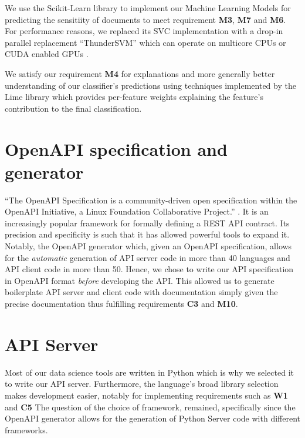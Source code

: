 \documentclass[\version]{l4proj}
\begin{document}
We use the Scikit-Learn library to implement our Machine Learning Models \autocite{pedregosaScikitlearnMachineLearning2011} for predicting the sensitiity of documents to meet requirement \textbf{M3}, \textbf{M7} and \textbf{M6}. For performance reasons, we replaced its SVC implementation with a drop-in parallel replacement ``ThunderSVM'' which can operate on multicore CPUs or CUDA enabled GPUs \autocite{wenThunderSVMFastSVM2018}.

We satisfy our requirement \textbf{M4} for explanations and more generally better understanding of our classifier's predictions using techniques implemented by the Lime library \autocite{ribeiroWhyShouldTrust2016} which provides per-feature weights explaining the feature's contribution to the final classification.

\section{OpenAPI specification and generator}

``The OpenAPI Specification is a community-driven open specification within the OpenAPI Initiative, a Linux Foundation Collaborative Project.'' \autocite{OAIOpenAPISpecification2020}.
It is an increasingly popular framework for formally defining a REST API contract.
Its precision and specificity is such that it has allowed powerful tools to expand it.
Notably, the OpenAPI generator \autocite{OpenAPIToolsOpenapigenerator2020} which, given an OpenAPI specification, allows for the \textit{automatic} generation of API server code in more than 40 languages and API client code in more than 50.
Hence, we chose to write our API specification in OpenAPI format \textit{before} developing the API.
This allowed us to generate boilerplate API server and client code with documentation simply given the precise documentation thus fulfilling requirements \textbf{C3} and \textbf{M10}.

\section{API Server}

Most of our data science tools are written in Python which is why we selected it to write our API server.
Furthermore, the language's broad library selection makes development easier, notably for implementing requirements such as \textbf{W1} and \textbf{C5}
The question of the choice of framework, remained, specifically since the OpenAPI generator allows for the generation of Python Server code with different frameworks.
\end{document}
